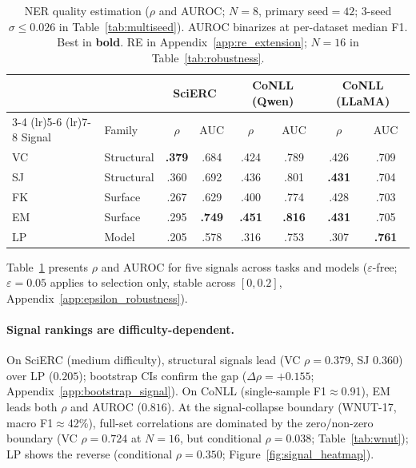 \begin{table}[t]
\centering
\small
\caption{NER quality estimation ($\rho$ and AUROC; $N{=}8$, primary seed${=}42$; 3-seed $\sigma{\leq}0.026$ in Table~\ref{tab:multiseed}). AUROC binarizes at per-dataset median F1. Best in \textbf{bold}. RE in Appendix~\ref{app:re_extension}; $N{=}16$ in Table~\ref{tab:robustness}.}
\label{tab:quality_estimation}
\begin{tabular}{ll cc cc cc}
\toprule
& & \multicolumn{2}{c}{\textbf{SciERC}} & \multicolumn{2}{c}{\textbf{CoNLL (Qwen)}} & \multicolumn{2}{c}{\textbf{CoNLL (LLaMA)}} \\
\cmidrule(lr){3-4} \cmidrule(lr){5-6} \cmidrule(lr){7-8}
Signal & Family & $\rho$ & AUC & $\rho$ & AUC & $\rho$ & AUC \\
\midrule
VC & Structural & \textbf{.379} & .684 & .424 & .789 & .426 & .709 \\
SJ  & Structural & .360 & .692 & .436 & .801 & \textbf{.431} & .704 \\
FK & Surface & .267 & .629 & .400 & .774 & .428 & .703 \\
EM  & Surface    & .295 & \textbf{.749} & \textbf{.451} & \textbf{.816} & \textbf{.431} & .705 \\
\midrule
LP     & Model      & .205 & .578 & .316 & .753 & .307 & \textbf{.761} \\
\bottomrule
\end{tabular}
\end{table}

Table~\ref{tab:quality_estimation} presents $\rho$ and AUROC for five signals across tasks and models ($\varepsilon$-free; $\varepsilon{=}0.05$ applies to selection only, stable across $[0, 0.2]$, Appendix~\ref{app:epsilon_robustness}).

\paragraph{Signal rankings are difficulty-dependent.}
On SciERC (medium difficulty), structural signals lead (VC $\rho{=}0.379$, SJ $0.360$) over LP ($0.205$); bootstrap CIs confirm the gap ($\Delta\rho{=}{+}0.155$; Appendix~\ref{app:bootstrap_signal}).
On CoNLL (single-sample F1${\approx}$0.91), EM leads both $\rho$ and AUROC ($0.816$).
At the signal-collapse boundary (WNUT-17, macro F1${\approx}$42\%), full-set correlations are dominated by the zero/non-zero boundary (VC $\rho{=}0.724$ at $N{=}16$, but conditional $\rho{=}0.038$; Table~\ref{tab:wnut}); LP shows the reverse (conditional $\rho{=}0.350$; Figure~\ref{fig:signal_heatmap}).

